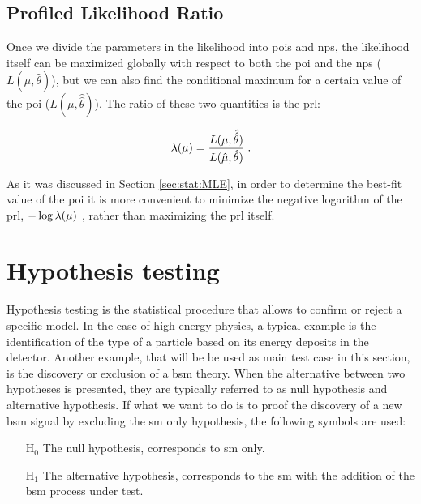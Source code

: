 \subsection{Profiled Likelihood Ratio}

Once we divide the parameters in the likelihood into \glspl{poi} and \glspl{np}, the likelihood itself can be maximized globally with respect to both the \gls{poi} and the \glspl{np} ($L(\hat{\mu}, \hat{\theta})$), but we can also find the conditional maximum for a certain value of the \gls{poi} ($L(\mu, \hat{\hat{\theta}})$). The ratio of these two quantities is the \gls{prl}:

\begin{equation}
\label{eq:stat:prl}
\lambda(\mu) = \frac{ L(\mu, \hat{\hat{\theta}}) } {L(\hat{\mu}, \hat{\theta}) } \;.
\end{equation}

\noindent As it was discussed in Section \ref{sec:stat:MLE},
in order to determine the best-fit value of the \gls{poi} it is more convenient to minimize the negative logarithm of the \gls{prl}, $- \log{\lambda(\mu)} \ $, 
rather than maximizing the \gls{prl} itself.


\section{Hypothesis testing}
\label{sec:stat:ht}

Hypothesis testing is the statistical procedure that allows to confirm or reject a specific model. In the case of high-energy physics, a typical example is the identification of the type of a particle based on its energy deposits in the detector. Another example, that will be be used as main test case in this section, is the discovery or exclusion of a \gls{bsm} theory. When the alternative between two hypotheses is presented, they are typically referred to as null hypothesis and alternative hypothesis. If what we want to do is to proof the discovery of a new \gls{bsm} signal by excluding the \gls{sm} only hypothesis, the following symbols are used:

\begin{itemize}
\item[H$_0$] The null hypothesis, corresponds to \gls{sm} only.
\item[H$_1$] The alternative hypothesis, corresponds to the \gls{sm} with the addition of the \gls{bsm} process under test.
\end{itemize}


